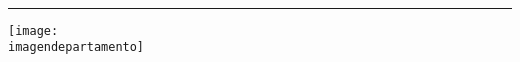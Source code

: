{{{{{{{{{{{{{{		%
		\noindent
		\vspace*{-1.5cm}
		\begin{flushleft}
			\begin{minipage}{0.65\textwidth}
				\ifthenelse{\equal{\nombreuniversidad}{\xspace}}{
					{\fontsize{3.5mm}{0.5mm} \selectfont \noindent \textsf{\nombrefacultad}} ~ \\
				}{
					{\fontsize{3.5mm}{0.5mm} \selectfont \noindent \textsf{\nombreuniversidad, \nombrefacultad}} ~ \\
				}
				\noindent {\fontsize{3.0mm}{0.5mm} \selectfont \textsf{\departamentouniversidad} \vspace{-0.2cm}} ~ \\
				\noindent \textcolor{gray}{\rule{\textwidth}{0.3mm}}
			\end{minipage}
		\end{flushleft}
		\vspace*{-2.15cm}
		\begin{flushright}
			\begin{minipage}{0.3\textwidth}
				\noindent \texttt{[image: \\imagendepartamento]}
			\end{minipage}
		\end{flushright}

		\vfill
		\begin{center}
			\begin{minipage}{0.9\textwidth}
				\begin{framed}
					\LARGE
					\vspace{1cm}
					\centering \textcolor{\portraittitlecolor}{\textbf{\titulodelinforme}}
					\vspace{1cm}
				\end{framed}
			\end{minipage}
		\end{center}

		\vfill
		\begin{flushright}
			\noindent \textsf{\tablaintegrantes}
		\end{flushright}
	}{
	}}}}}}}}}}}}}}
